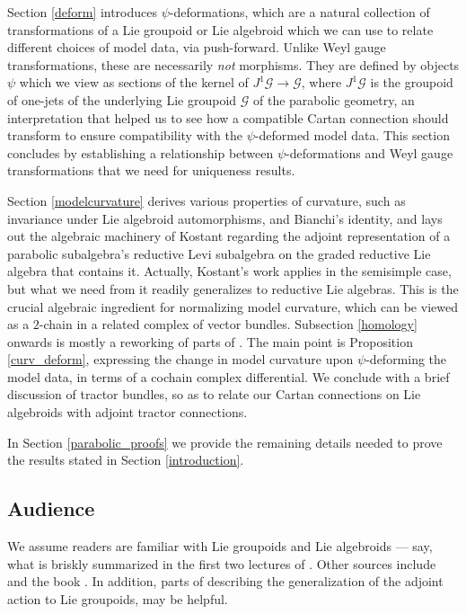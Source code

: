 \documentclass[leqno,12pt]{amsart} %
\begin{document}
Section \ref{deform} introduces $\psi$-deformations, which are a natural collection
of transformations of a Lie groupoid or Lie algebroid which we can use to relate different
choices of model data, via push-forward. Unlike Weyl gauge transformations, these are
necessarily {\em not} morphisms. They are defined by objects $\psi$ which we view as
sections of the kernel of $J^1 {\mathcal G} \rightarrow {\mathcal G} $, where
$J^1 {\mathcal G} $ is the groupoid of one-jets of the underlying Lie groupoid
${\mathcal G} $ of the parabolic geometry, an interpretation that helped us to see how a
compatible Cartan connection should transform to ensure compatibility with the
$\psi$-deformed model data. This section concludes by establishing a relationship between
$\psi$-deformations and Weyl gauge transformations that we need for uniqueness results.

Section \ref{modelcurvature} derives various properties of curvature, such as invariance
under Lie algebroid automorphisms, and Bianchi's identity, and lays out the algebraic
machinery of Kostant \cite{Kostant_61} regarding the adjoint representation of a parabolic
subalgebra's reductive Levi subalgebra on the graded reductive Lie algebra that contains
it. Actually, Kostant's work applies in the semisimple case, but what we need from it
readily generalizes to reductive Lie algebras. This is the crucial algebraic
ingredient for normalizing model curvature, which can be viewed as a $2$-chain in a
related complex of vector bundles. Subsection \ref{homology} onwards is mostly a reworking
of parts of \cite[\S3.1]{Cap_Slovak_09}. The main point is Proposition \ref{curv_deform},
expressing the change in model curvature upon $\psi $-deforming the model data, in terms
of a cochain complex differential. We conclude with a brief discussion of tractor bundles,
so as to relate our Cartan connections on Lie algebroids with adjoint tractor connections.

In Section \ref{parabolic_proofs} we provide the remaining details needed to prove the
results stated in Section \ref{introduction}.

\subsection*{Audience} We assume readers are familiar with Lie groupoids and Lie
algebroids --- say, what is briskly summarized in the first two lectures of
\cite{Crainic_Fernandes_11}. Other sources include
\cite{CannasdaSilva_Weinstein_99,Moerdijk_Mrcun_03,Dufour_Nguyen_05} and the book
\cite{Mackenzie_05}. In addition, parts of \cite{Blaom_16b} describing the generalization
of the adjoint action to Lie groupoids, may be helpful.
\end{document}
